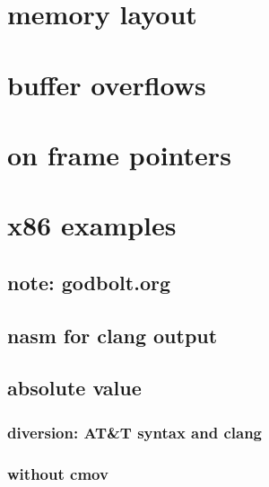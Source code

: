\section{memory layout}



\section{buffer overflows}



\section{on frame pointers}




\section{x86 examples}

\subsection{note: godbolt.org}



\subsection{nasm for clang output}



\subsection{absolute value}





\subsubsection{diversion: AT\&T syntax and clang}





\subsubsection{without cmov}

